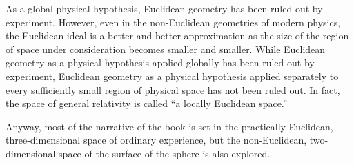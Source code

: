 As a global physical hypothesis, Euclidean geometry has been ruled out by
experiment.
However, even in the non-Euclidean geometries of modern physics, the Euclidean
ideal is a better and better approximation as the size of the region of space
under consideration becomes smaller and smaller.  While Euclidean geometry as a
physical hypothesis applied globally has been ruled out by experiment,
Euclidean geometry as a physical hypothesis applied separately to every
sufficiently small region of physical space has not been ruled out.  In fact,
the space of general relativity is called ``a locally Euclidean space.''

Anyway, most of the narrative of the book is set in the practically Euclidean,
three-dimensional space of ordinary experience, but the non-Euclidean,
two-dimensional space of the surface of the sphere is also explored.

